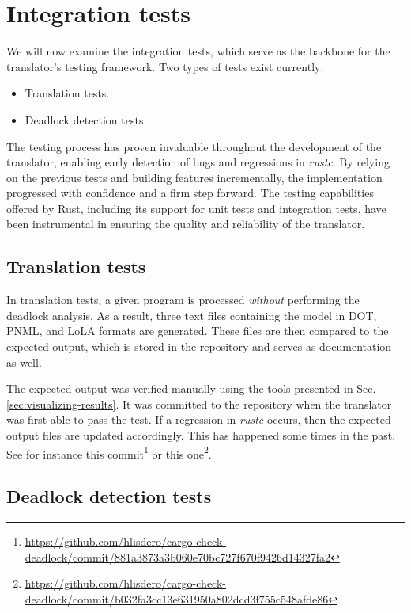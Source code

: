 \section{Integration tests}
\label{sec:integration-tests}

We will now examine the integration tests,
which serve as the backbone for the translator's testing framework.
Two types of tests exist currently:

\begin{itemize}
    \item Translation tests.
    \item Deadlock detection tests.
\end{itemize}

The testing process has proven invaluable throughout the development of the translator,
enabling early detection of bugs and regressions in \emph{rustc}.
By relying on the previous tests and building features incrementally,
the implementation progressed with confidence and a firm step forward.
The testing capabilities offered by Rust,
including its support for unit tests and integration tests,
have been instrumental in ensuring the quality and reliability of the translator.

\subsection{Translation tests}

In translation tests, a given program is processed
\emph{without} performing the deadlock analysis.
As a result, three text files containing the model
in DOT, \acrshort{PNML}, and \acrshort{LoLA} formats are generated.
These files are then compared to the expected output,
which is stored in the repository and serves as documentation as well.

The expected output was verified manually
using the tools presented in Sec. \ref{sec:visualizing-results}.
It was committed to the repository
when the translator was first able to pass the test.
If a regression in \emph{rustc} occurs,
then the expected output files are updated accordingly.
This has happened some times in the past.
See for instance
this commit\footnote{\url{https://github.com/hlisdero/cargo-check-deadlock/commit/881a3873a3b060e70bc727f670f9426d14327fa2}}
or this one\footnote{\url{https://github.com/hlisdero/cargo-check-deadlock/commit/b032fa3cc13e631950a802dcd3f755c548afde86}}.

\subsection{Deadlock detection tests}

